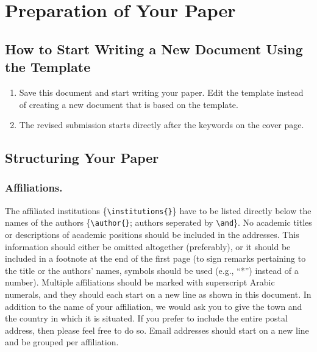\section{Preparation of Your Paper}
\label{sec:theoretical_background}
\subsection{How to Start Writing a New Document Using the Template}
\begin{enumerate}
    \item Save this document and start writing your paper. Edit the template instead of creating a new document that is based on the template.
    \item The revised submission starts directly after the keywords on the cover page.
\end{enumerate}

\subsection{Structuring Your Paper}
\subsubsection{Affiliations.} The affiliated institutions \{\verb|\institutions{}|\} have to be listed directly below the names of the authors \{\verb|\author{}|; authors seperated by \verb|\and|\}. 
No academic titles or descriptions of academic positions should be included in the addresses. 
This information should either be omitted altogether (preferably), or it should be included in a footnote at the end of the first page (to sign remarks pertaining to the title or the authors’ names, symbols should be used (e.g., “*”) instead of a number). 
Multiple affiliations should be marked with superscript Arabic numerals, and they should each start on a new line as shown in this document. 
In addition to the name of your affiliation, we would ask you to give the town and the country in which it is situated. 
If you prefer to include the entire postal address, then please feel free to do so. 
Email addresses should start on a new line and be grouped per affiliation.

